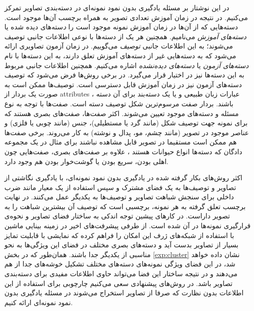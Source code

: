 در این نوشتار بر مسئله یادگیری بدون نمود نمونه‌ای در دسته‌بندی تصاویر تمرکز می‌کنیم. در نتیجه در زمان آموزش تعدادی تصویر به همراه برچسب آن‌ها موجود است. دسته‌هایی که از آن‌ها در زمان آموزش نمونه موجود است را {\emph دسته‌های دیده شده} یا \emph{ دسته‌های آموزش} می‌نامیم. همچنین هر یک از دسته‌ها با نوعی اطلاعات جانبی توصیف می‌شوند؛ به این اطلاعات جانبی \emph{ توصیف}  می‌گوییم. در زمان آزمون تصاویری ارائه می‌شود که به دسته‌هایی غیر از دسته‌های آموزش تعلق دارند، به این دسته‌ها با نام\emph{  دسته‌های آزمون}  یا \emph{ دسته‌های دیده‌نشده}  اشاره می‌کنیم. همچنین اطلاعات جانبی مربوط به این دسته‌ها نیز در اختیار قرار می‌گیرد. در برخی روش‌ها فرض می‌شود که توصیف دسته‌های آزمون نیز در زمان آموزش قابل دسترسی است. توصیف‌ها ممکن است به صورت یک بردار از
\glspl{attribute}
 \cite{farhadi09}،
 عبارات زبان طبیعی
 \cite{ng13, mohamed13, convex}
 و یا یک دسته‌بند برای آن دسته  \cite{Yu2013} باشند. بردار صفت مرسوم‌ترین شکل توصیف دسته است. صفت‌ها با توجه به نوع مسئله و دسته‌های موجود تعیین می‌شوند. اکثر صفت‌ها، صفت‌های بصری هستند که برای نمونه جهت توصیف  شکل (مانند گرد یا مستطیلی)، جنس (مانند چوبی یا فلزی) و عناصر موجود در تصویر (مانند چشم، مو، پدال و نوشته) به کار می‌روند. برخی صفت‌ها هم ممکن است مستقیما در تصویر قابل مشاهده نباشند برای مثال در یک مجموعه دادگان که دسته‌ها انواع حیوانات هستند
 \cite{lampert09}،
 علاوه بر صفت‌های بصری، صفت‌هایی چون اهلی بودن، سریع‌ بودن یا گوشت‌خوار بودن هم وجود دارد.

 اکثر روش‌های بکار گرفته شده در یادگیری بدون نمود نمونه‌ای، با یادگیری نگاشتی از تصاویر و توصیف‌ها به یک فضای مشترک و سپس استفاده از یک معیار مانند ضرب داخلی برای سنجش شباهت تصاویر و توصیف‌ها به یکدیگر عمل می‌کنند. در نهایت برچسب تعلق گرفته به هر نمونه، برچسبی است که توصیف آن بیشترین شباهت را به تصویر داراست. در کارهای پیشین توجه اندکی به ساختار فضای تصاویر و نحوه‌ی قرارگیری نمونه‌ها در آن شده است. از طرفی پیشرفت‌های اخیر در زمینه بینایی ماشین با استفاده از شبکه‌های ژرف \cite{vgg} این امکان را فراهم کرده که نمایشی با قابلیت تمایز بسیار از تصاویر بدست آید و دسته‌های بصری مختلف در فضای این ویژگی‌ها به نحو مناسبی از یکدیگر جدا باشند. همان‌طور که در بخش \ref{exp:cluster} نشان داده خواهد شد، در این فضای ویژگی  نمونه‌های دسته‌های مختلف تشکیل خوشه‌های جدا از هم می‌دهند و در نتیجه ساختار این فضا می‌تواند حاوی اطلاعات مفیدی برای دسته‌بندی تصاویر باشد. در روش‌های پیشنهادی سعی می‌کنیم چارچوبی برای استفاده از این اطلاعات بدون نظارت که صرفا از تصاویر استخراج می‌شوند در مسئله یادگیری بدون نمود نمونه‌ای ارائه کنیم.


